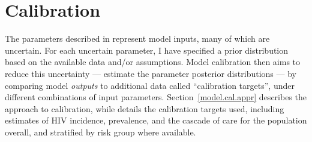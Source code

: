 \section{Calibration}\label{model.cal}
The parameters described in  represent model inputs, many of which are uncertain.
For each uncertain parameter, I have specified a prior distribution based on
the available data and/or assumptions.
Model calibration then aims to reduce this uncertainty
--- \ie estimate the parameter posterior distributions ---
by comparing model \emph{outputs} to additional data called ``calibration targets'',
under different combinations of input parameters.
Section~\ref{model.cal.appr} describes the approach to calibration, while
 details the calibration targets used,
including estimates of HIV incidence, prevalence, and the cascade of care
for the population overall, and stratified by risk group where available.

